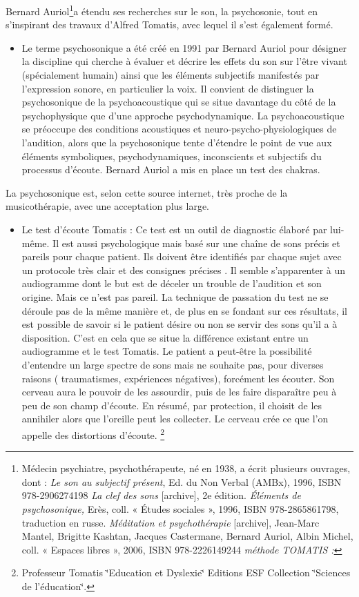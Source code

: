 Bernard Auriol\footnote{Médecin psychiatre, psychothérapeute, né en 1938, a écrit plusieurs
ouvrages, dont : \emph{Le son au subjectif présent}, Ed. du Non Verbal
(AMBx), 1996, ISBN 978-2906274198\emph{ La clef des sons} {[}archive{]},
2e édition. \emph{Éléments de psychosonique,} Erès, coll. « Études
sociales », 1996, ISBN 978-2865861798, traduction en russe. \emph{Méditation
et psychothérapie} {[}archive{]}, Jean-Marc Mantel, Brigitte Kashtan,
Jacques Castermane, Bernard Auriol, Albin Michel, coll. « Espaces
libres », 2006, ISBN 978-2226149244\emph{ méthode TOMATIS :} }a étendu ses recherches sur le son, la psychosonie, tout en s'inspirant
des travaux d'Alfred Tomatis, avec lequel il s'est également formé.
\begin{itemize}
\item Le terme psychosonique a été créé en 1991 par Bernard Auriol pour
désigner la discipline qui cherche à évaluer et décrire les effets
du son sur l'être vivant (spécialement humain) ainsi que les éléments
subjectifs manifestés par l'expression sonore, en particulier la voix.
Il convient de distinguer la psychosonique de la psychoacoustique
qui se situe davantage du côté de la psychophysique que d'une approche
psychodynamique. La psychoacoustique se préoccupe des conditions acoustiques
et neuro-psycho-physiologiques de l'audition, alors que la psychosonique
tente d'étendre le point de vue aux éléments symboliques, psychodynamiques,
inconscients et subjectifs du processus d'écoute. Bernard Auriol a
mis en place un test des chakras.
\end{itemize}
La psychosonique est, selon cette source internet, très proche de
la musicothérapie, avec une acceptation plus large. 
\begin{itemize}
\item Le test d'écoute Tomatis : Ce test est un outil de diagnostic élaboré
par lui-même. Il est aussi psychologique mais basé sur une chaîne
de sons précis et pareils pour chaque patient. Ils doivent être identifiés
par chaque sujet avec un protocole très clair et des consignes précises
. Il semble s'apparenter à un audiogramme dont le but est de déceler
un trouble de l'audition et son origine. Mais ce n'est pas pareil.
La technique de passation du test ne se déroule pas de la même manière
et, de plus en se fondant sur ces résultats, il est possible de savoir
si le patient désire ou non se servir des sons qu'il a à disposition.
C'est en cela que se situe la différence existant entre un audiogramme
et le test Tomatis. Le patient a peut-être la possibilité d'entendre
un large spectre de sons mais ne souhaite pas, pour diverses raisons
( traumatismes, expériences négatives), forcément les écouter. Son
cerveau aura le pouvoir de les assourdir, puis de les faire disparaître
peu à peu de son champ d'écoute. En résumé, par protection, il choisit
de les annihiler alors que l'oreille peut les collecter. Le cerveau
crée ce que l'on appelle des distortions d'écoute. \footnote{Professeur Tomatis \char`\"{}Education et Dyslexie\char`\"{} Editions
ESF Collection \char`\"{}Sciences de l'éducation\char`\"{}.}
\end{itemize}
